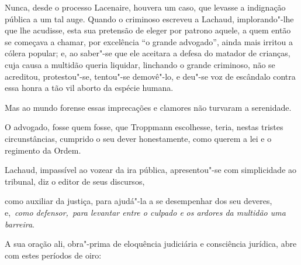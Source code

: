 Nunca, desde o processo Lacenaire, houvera um caso, que levasse a 
indignação pública a um tal auge. Quando o criminoso escreveu a
Lachaud, implorando"-lhe que lhe acudisse, esta sua pretensão de
eleger por patrono aquele, a quem então se começava a chamar, por
excelência “o grande advogado”, ainda mais irritou a cólera popular; e,
ao saber"-se que ele aceitara a defesa do matador de crianças, cuja
causa a multidão queria liquidar, linchando o grande criminoso, não
se acreditou, protestou"-se, tentou"-se demovê"-lo, e deu"-se voz de
escândalo contra essa honra a tão vil aborto da espécie humana. 

Mas ao mundo forense essas imprecações e clamores não turvaram a serenidade.

\begin{hedraquote}
O advogado, fosse quem fosse, que Troppmann escolhesse, teria, nestas
tristes circunstâncias, cumprido o seu dever honestamente, como querem
a lei e o regimento da Ordem.
\end{hedraquote}

Lachaud, impassível ao vozear da ira pública, apresentou"-se com simplicidade 
ao tribunal, diz o editor de seus discursos, 

\begin{hedraquote}
como auxiliar da justiça, para ajudá"-la a se
desempenhar dos seu deveres, e, \textit{como defensor, para levantar
entre o culpado e} \textit{os ardores da multidão uma barreira}.
\end{hedraquote}

 A sua oração ali, obra"-prima de eloquência judiciária e consciência
jurídica, abre com estes períodos de oiro: 

